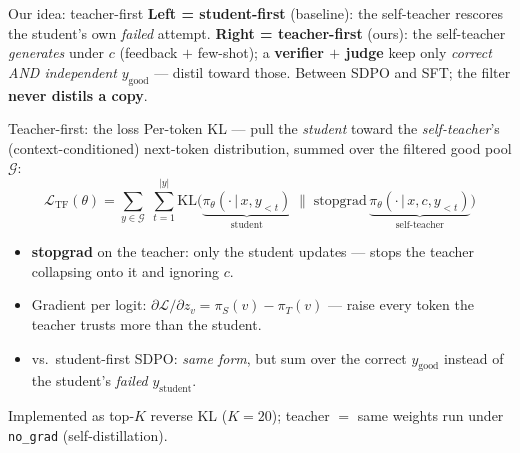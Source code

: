 \documentclass[10pt,aspectratio=169]{beamer}
\begin{document}
\begin{frame}{Our idea: teacher-first}
\centering
{}
\vfill
{\small \textbf{Left = student-first} (baseline): the self-teacher rescores the student's own \emph{failed} attempt. \textbf{Right = teacher-first} (ours): the self-teacher \emph{generates} under $c$ (feedback $+$ few-shot); a \textbf{verifier $+$ judge} keep only \emph{correct AND independent} $y_{\text{good}}$ --- distil toward those. Between SDPO and SFT; the filter \textbf{never distils a copy}.}
\end{frame}

\begin{frame}{Teacher-first: the loss}
Per-token KL --- pull the \emph{student} toward the \emph{self-teacher}'s (context-conditioned) next-token distribution, summed over the filtered good pool $\mathcal{G}$:
\vfill
\[
\mathcal{L}_{\text{TF}}(\theta) = \sum_{y \in \mathcal{G}}\;\sum_{t=1}^{|y|}
\mathrm{KL}\!\Big(\underbrace{\pi_\theta(\cdot\,|\,x, y_{<t})}_{\text{student}} \;\big\|\;
\mathrm{stopgrad}\,\underbrace{\pi_\theta(\cdot\,|\,x, c, y_{<t})}_{\text{self-teacher}}\Big)
\]
\vfill
\begin{itemize}
  \item \textbf{stopgrad} on the teacher: only the student updates --- stops the teacher collapsing onto it and ignoring $c$.
  \item Gradient per logit: $\partial\mathcal{L}/\partial z_v = \pi_S(v) - \pi_T(v)$ --- raise every token the teacher trusts more than the student.
  \item vs.\ student-first SDPO: \emph{same form}, but sum over the \alert{correct $y_{\text{good}}$} instead of the student's \emph{failed} $y_{\text{student}}$.
\end{itemize}
\vfill
{\footnotesize Implemented as top-$K$ reverse KL ($K{=}20$); teacher $=$ same weights run under \texttt{no\_grad} (self-distillation).}
\end{frame}
\end{document}
